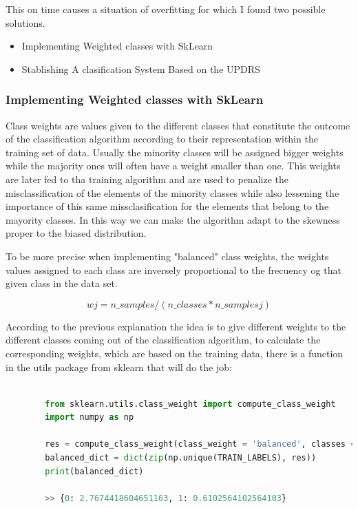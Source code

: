 \documentclass[12pt, a4paper]{article}
\begin{document}
	This on time causes a situation of overfitting for which I found two possible solutions.
	
	\begin{itemize}
		
		\item Implementing Weighted classes with SkLearn
		
		\item Stablishing A clasification System Based on the UPDRS
		
	\end{itemize}
	
	\clearpage
	
	\subsubsection{Implementing Weighted classes with SkLearn}
	
	
	Class weights are values given to the different classes that constitute the outcome of the classification algorithm according to their representation within the training set of data. Usually the minority classes will be assigned bigger weights while the majority ones will often have a weight smaller than one. This weights are later fed to tha training algorithm and are used to penalize the misclassification of the elements of the minority classes while also lessening the importance of this same missclasification for the elements that belong to the mayority classes. In this way we can make the algorithm adapt to the skewness proper to the biased distribution.
	
	To be more precise when implementing "balanced" class weights, the weights values assigned to each class are inversely proportional to the frecuency og that given class in the data set.\cite{classWeights}
	
	\[ wj = n\_samples / (n\_classes * n\_samplesj) \] 
	
	According to the previous explanation the idea is to give different weights to the different classes coming out of the classification algorithm, to calculate the corresponding weights, which are based on the training data, there is a function in the utils package from sklearn that will do the job:
	
	\vspace{5mm}
	
	\begin{lstlisting}[language=Python]
			
		from sklearn.utils.class_weight import compute_class_weight
		import numpy as np
		
		res = compute_class_weight(class_weight = 'balanced', classes = np.unique(TRAIN_LABELS), y = TRAIN_LABELS);
		balanced_dict = dict(zip(np.unique(TRAIN_LABELS), res))
		print(balanced_dict)
		
		>> {0: 2.7674418604651163, 1: 0.6102564102564103}
	
	\end{lstlisting}
\end{document}
